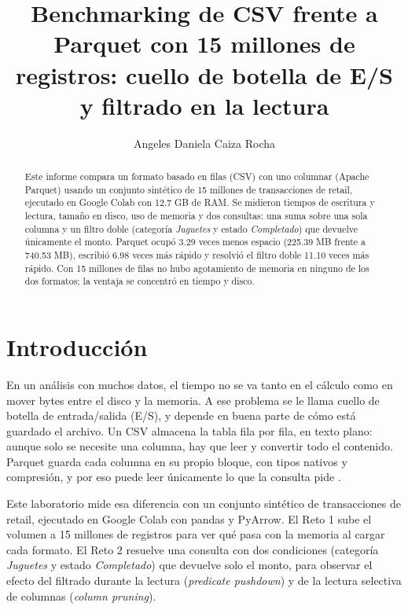 \documentclass[runningheads]{llncs}
\begin{document}
\title{Benchmarking de CSV frente a Parquet con 15 millones de registros: cuello de botella de E/S y filtrado en la lectura}

\author{Angeles Daniela Caiza Rocha}


\maketitle

\begin{abstract}
Este informe compara un formato basado en filas (CSV) con uno columnar (Apache Parquet) usando un conjunto sintético de 15 millones de transacciones de retail, ejecutado en Google Colab con 12.7 GB de RAM. Se midieron tiempos de escritura y lectura, tamaño en disco, uso de memoria y dos consultas: una suma sobre una sola columna y un filtro doble (categoría \emph{Juguetes} y estado \emph{Completado}) que devuelve únicamente el monto. Parquet ocupó 3.29 veces menos espacio (225.39 MB frente a 740.53 MB), escribió 6.98 veces más rápido y resolvió el filtro doble 11.10 veces más rápido. Con 15 millones de filas no hubo agotamiento de memoria en ninguno de los dos formatos; la ventaja se concentró en tiempo y disco.
\end{abstract}

\section{Introducción}

En un análisis con muchos datos, el tiempo no se va tanto en el cálculo como en mover bytes entre el disco y la memoria. A ese problema se le llama cuello de botella de entrada/salida (E/S), y depende en buena parte de cómo está guardado el archivo. Un CSV almacena la tabla fila por fila, en texto plano: aunque solo se necesite una columna, hay que leer y convertir todo el contenido. Parquet guarda cada columna en su propio bloque, con tipos nativos y compresión, y por eso puede leer únicamente lo que la consulta pide \cite{parquet}.

Este laboratorio mide esa diferencia con un conjunto sintético de transacciones de retail, ejecutado en Google Colab con pandas y PyArrow. El Reto 1 sube el volumen a 15 millones de registros para ver qué pasa con la memoria al cargar cada formato. El Reto 2 resuelve una consulta con dos condiciones (categoría \emph{Juguetes} y estado \emph{Completado}) que devuelve solo el monto, para observar el efecto del filtrado durante la lectura (\emph{predicate pushdown}) y de la lectura selectiva de columnas (\emph{column pruning}).
\end{document}
